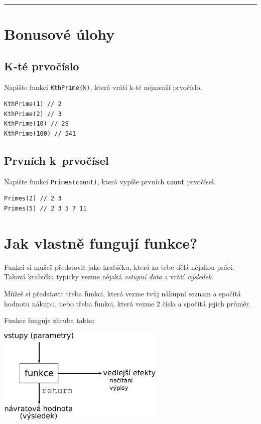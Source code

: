 \documentclass[12pt,a4paper]{article}
\begin{document}
\noindent\rule{\textwidth}{1pt}
\section*{Bonusové úlohy}

\begin{multicols}{2}

\subsection{K-té prvočíslo}

Napište funkci \texttt{KthPrime(k)}, která vrátí k-té nejmenší prvočíslo.

\begin{verbatim}
KthPrime(1) // 2
KthPrime(2) // 3
KthPrime(10) // 29
KthPrime(100) // 541
\end{verbatim}

\subsection{Prvních k~prvočísel}

Napište funkci \texttt{Primes(count)}, která vypíše prvních \texttt{count}
prvočísel.

\begin{verbatim}
Primes(2) // 2 3
Primes(5) // 2 3 5 7 11
\end{verbatim}

\end{multicols}

\newpage

\section*{Jak vlastně fungují funkce?}

Funkci si můžeš představit jako krabičku, která za tebe dělá nějakou práci.
Taková krabička typicky vezme nějaká \textit{vstupní data} a vrátí
\textit{výsledek}.

Můžeš si představit třeba funkci, která vezme tvůj nákupní seznam a spočítá
hodnotu nákupu, nebo třeba funkci, která vezme 2 čísla a spočítá jejich
průměr.

Funkce funguje zhruba takto:

\vspace{5mm}
\includegraphics[width=8cm]{diagram.pdf}
\vspace{5mm}
\end{document}
